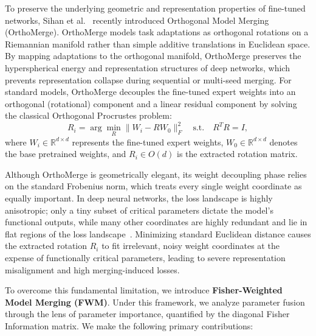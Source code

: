 \documentclass{article}
\theoremstyle{plain}
\theoremstyle{definition}
\theoremstyle{remark}
\begin{document}
To preserve the underlying geometric and representation properties of fine-tuned networks, Sihan et al.~\cite{yang26, Yang2026OrthogonalMM} recently introduced Orthogonal Model Merging (OrthoMerge). OrthoMerge models task adaptations as orthogonal rotations on a Riemannian manifold rather than simple additive translations in Euclidean space. By mapping adaptations to the orthogonal manifold, OrthoMerge preserves the hyperspherical energy and representation structures of deep networks, which prevents representation collapse during sequential or multi-seed merging. For standard models, OrthoMerge decouples the fine-tuned expert weights into an orthogonal (rotational) component and a linear residual component by solving the classical Orthogonal Procrustes problem:
\begin{equation}
R_i = \arg \min_R \|W_i - R W_0\|_F^2 \quad \text{s.t.} \quad R^T R = I,
\end{equation}
where $W_i \in \mathbb{R}^{d \times d}$ represents the fine-tuned expert weights, $W_0 \in \mathbb{R}^{d \times d}$ denotes the base pretrained weights, and $R_i \in O(d)$ is the extracted rotation matrix.

Although OrthoMerge is geometrically elegant, its weight decoupling phase relies on the standard Frobenius norm, which treats every single weight coordinate as equally important. In deep neural networks, the loss landscape is highly anisotropic; only a tiny subset of critical parameters dictate the model's functional outputs, while many other coordinates are highly redundant and lie in flat regions of the loss landscape~\cite{Jin2022DatalessKF, Roy2025AlignMergeA}. Minimizing standard Euclidean distance causes the extracted rotation $R_i$ to fit irrelevant, noisy weight coordinates at the expense of functionally critical parameters, leading to severe representation misalignment and high merging-induced losses.

To overcome this fundamental limitation, we introduce \textbf{Fisher-Weighted Model Merging (FWM)}. Under this framework, we analyze parameter fusion through the lens of parameter importance, quantified by the diagonal Fisher Information matrix. We make the following primary contributions:
\end{document}
